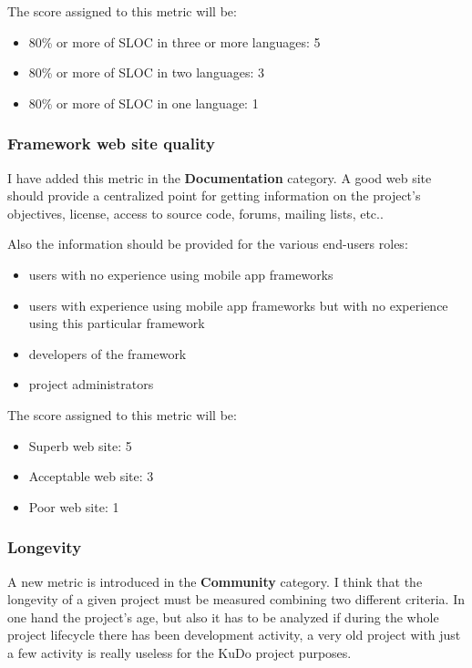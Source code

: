\documentclass[a4paper,12pt]{book}
\begin{document}
The score assigned to this metric will be:
\begin{itemize}
 \item 80\% or more of SLOC in three or more languages: 5
 \item 80\% or more of SLOC in two languages: 3
 \item 80\% or more of SLOC in one language: 1
\end{itemize}

\subsubsection{Framework web site quality}
\label{Framework web site quality}

I have added this metric in the \textbf{Documentation} category. A good web site should provide a centralized point for getting information on the project's objectives, license, access to source code, forums, mailing lists, etc..

Also the information should be provided for the various end-users roles: 
\begin{itemize}
 \item users with no experience using mobile app frameworks
 \item users with experience using mobile app frameworks but with no experience using this particular framework
 \item developers of the framework
 \item project administrators
\end{itemize}

The score assigned to this metric will be:
\begin{itemize}
 \item Superb web site: 5
 \item Acceptable web site: 3
 \item Poor web site: 1
\end{itemize}

\subsubsection{Longevity}
\label{Longevity}
A new metric is introduced in the \textbf{Community} category. I think that the longevity of a given project must be measured combining two different criteria. In one hand the project's age, but also it has to be analyzed if during the whole project lifecycle there has been development activity, a very old project with just a few activity is really useless for the KuDo project purposes.
\end{document}
